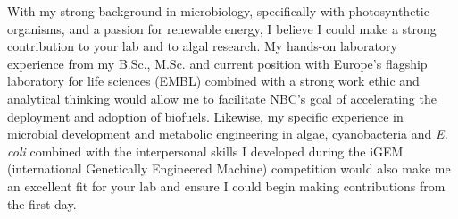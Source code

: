 \documentclass[11pt,a4paper,sans]{moderncv}
\date{\today}
\begin{document}
     
\makelettertitle
\begin{spacing}{1.15}
        

With my strong background in microbiology, specifically with photosynthetic organisms, and a passion for renewable energy, I believe I could make a strong contribution to your lab and to algal research. 
My hands-on laboratory experience from my B.Sc., M.Sc. and current position with Europe's flagship laboratory for life sciences (EMBL) combined with a strong work ethic and analytical thinking would allow me to facilitate NBC's goal of accelerating the deployment and adoption of biofuels.
Likewise, my specific experience in microbial development and metabolic engineering in algae, cyanobacteria and \textit{E. coli} combined with the interpersonal skills I developed during the iGEM (international Genetically Engineered Machine) competition would also make me an excellent fit for your lab and ensure I could begin making contributions from the first day. 


\par\vspace*{1mm}


\end{spacing}
\end{document}
